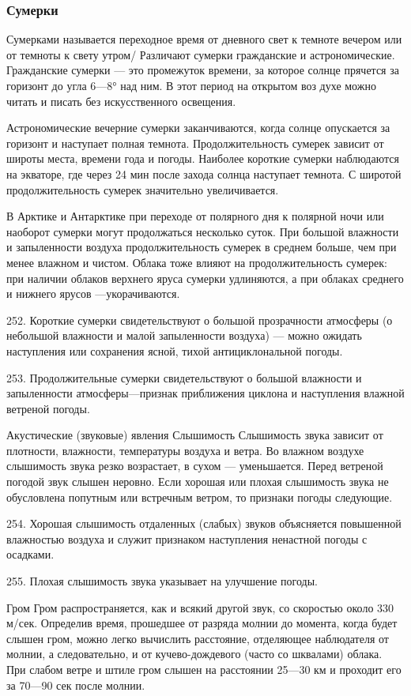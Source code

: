 \subsubsection{Сумерки}

Сумерками называется переходное время от дневного свет к темноте вечером или от темноты к свету утром/ Различают сумерки гражданские и астрономические. Гражданские сумерки — это промежуток времени, за которое солнце прячется за горизонт до угла 6—8° над ним. В этот период на открытом воз духе можно читать и писать без искусственного освещения.

Астрономические вечерние сумерки заканчиваются, когда солнце опускается за горизонт и наступает полная темнота. Продолжительность сумерек зависит от широты места, времени года и погоды. Наиболее короткие сумерки наблюдаются на экваторе, где через 24 мин после захода солнца наступает темнота. С широтой продолжительность сумерек значительно увеличивается.

В Арктике и Антарктике при переходе от полярного дня к полярной ночи или наоборот сумерки могут продолжаться несколько суток. При большой влажности и запыленности воздуха продолжительность сумерек в среднем больше, чем при менее влажном и чистом. Облака тоже влияют на продолжительность сумерек: при наличии облаков верхнего яруса сумерки удлиняются, а при облаках среднего и нижнего ярусов —укорачиваются.

252. Короткие сумерки свидетельствуют о большой прозрачности атмосферы (о небольшой влажности и малой запыленности воздуха) — можно ожидать наступления или сохранения ясной, тихой антициклональной погоды.

253. Продолжительные сумерки свидетельствуют о большой влажности и запыленности атмосферы—признак приближения циклона и наступления влажной ветреной погоды.

Акустические (звуковые) явления
Слышимость
Слышимость звука зависит от плотности, влажности, температуры воздуха и ветра. Во влажном воздухе слышимость звука резко возрастает, в сухом — уменьшается. Перед ветреной погодой звук слышен неровно. Если хорошая или плохая слышимость звука не обусловлена попутным или встречным ветром, то признаки погоды следующие.

254. Хорошая слышимость отдаленных (слабых) звуков объясняется повышенной влажностью воздуха и служит признаком наступления ненастной погоды с осадками.

255. Плохая слышимость звука указывает на улучшение погоды.

Гром
Гром распространяется, как и всякий другой звук, со скоростью около 330 м/сек. Определив время, прошедшее от разряда молнии до момента, когда будет слышен гром, можно легко вычислить расстояние, отделяющее наблюдателя от молнии, а следовательно, и от кучево-дождевого (часто со шквалами) облака. При слабом ветре и штиле гром слышен на расстоянии 25—30 км и проходит его за 70—90 сек после молнии.

